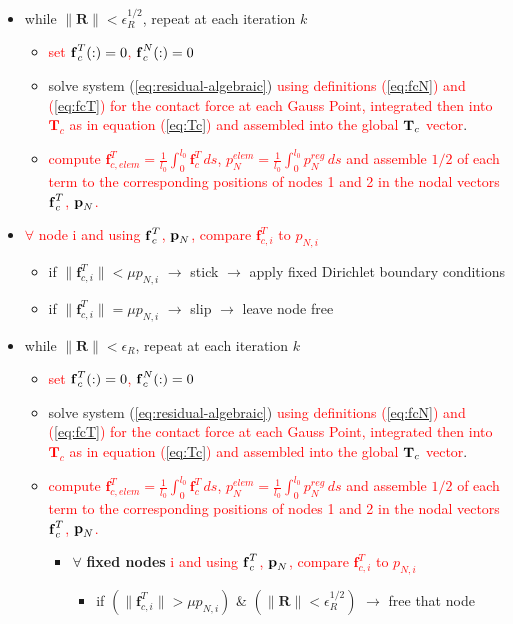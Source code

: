 \documentclass[3p]{elsarticle}
\newcommand{\vect}[1]{\boldsymbol{#1}}
\begin{document}
\begin{itemize}
	\item while $\|\vect{R}\|<\epsilon_R^{1/2}$, repeat at each iteration $k$
	\begin{itemize}
		\item \textcolor{red}{set $\text{\textbf{f}}_c^T(:)=0$, $\text{\textbf{f}}_c^N(:)=0$}
		\item solve system (\ref{eq:residual-algebraic}) \textcolor{red}{using definitions (\ref{eq:fcN}) and (\ref{eq:fcT}) for the contact force at each Gauss Point, integrated then into $\vect{T}_c$ as in equation (\ref{eq:Tc}) and assembled into the global $\text{\textbf{T}}_c$ vector}.
		\item \textcolor{red}{compute $\vect{f}_{c,elem}^T=\frac{1}{l_0}\int_0^{l_0}\vect{f}_{c}^T\,ds$, $p_N^{elem}=\frac{1}{l_0}\int_0^{l_0}p_N^{reg}\,ds$ and assemble $1/2$ of each term to the corresponding positions of nodes 1 and 2 in the nodal vectors $\text{\textbf{f}}_c^T$, $\text{\textbf{p}}_N$.}
	\end{itemize}
	\item \textcolor{red}{$\forall$ node i and using $\text{\textbf{f}}_c^T$, $\text{\textbf{p}}_N$, compare $\vect{f}_{c,i}^T$ to $p_{N,i}$}
	\begin{itemize}
		\item if $\|\vect{f}_{c,i}^T\|<\mu p_{N,i}$ $\rightarrow$ stick $\rightarrow$ apply fixed Dirichlet boundary conditions
		\item if $\|\vect{f}_{c,i}^T\|=\mu p_{N,i}$ $\rightarrow$ slip $\rightarrow$ leave node free 
	\end{itemize}
	\item while $\|\vect{R}\|<\epsilon_R$, repeat at each iteration $k$
	\begin{itemize}
		\item \textcolor{red}{set $\text{\textbf{f}}_c^T(:)=0$, $\text{\textbf{f}}_c^N(:)=0$}
		\item solve system (\ref{eq:residual-algebraic}) \textcolor{red}{using definitions (\ref{eq:fcN}) and (\ref{eq:fcT}) for the contact force at each Gauss Point, integrated then into $\vect{T}_c$ as in equation (\ref{eq:Tc}) and assembled into the global $\text{\textbf{T}}_c$ vector}.
		\item \textcolor{red}{compute $\vect{f}_{c,elem}^T=\frac{1}{l_0}\int_0^{l_0}\vect{f}_{c}^T\,ds$, $p_N^{elem}=\frac{1}{l_0}\int_0^{l_0}p_N^{reg}\,ds$ and assemble $1/2$ of each term to the corresponding positions of nodes 1 and 2 in the nodal vectors $\text{\textbf{f}}_c^T$, $\text{\textbf{p}}_N$.}
		\begin{itemize}
			\item $\forall$ \textbf{fixed nodes} \textcolor{red}{i and using $\text{\textbf{f}}_c^T$, $\text{\textbf{p}}_N$, compare $\vect{f}_{c,i}^T$ to $p_{N,i}$}
			\begin{itemize}
				\item if $\left(\|\vect{f}_{c,i}^T\|>\mu p_{N,i}\right)$ \& $(\|\vect{R}\|<\epsilon_R^{1/2})$ $\rightarrow$ free that node
			\end{itemize}	
		\end{itemize}	
	\end{itemize}
\end{itemize}
\newpage
\end{document}
